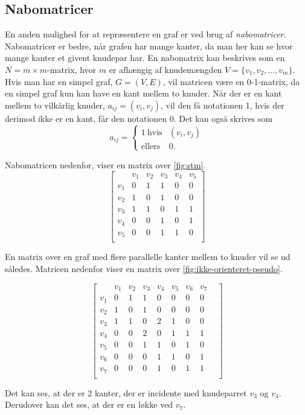 \subsection{Nabomatricer}
En anden mulighed for at repræsentere en graf er ved brug af \emph{nabomatricer}. Nabomatricer er bedre, når grafen har mange kanter, da man her kan se hvor mange kanter et givent knudepar har.
En nabomatrix kan beskrives som en $N=m \times m$-matrix, hvor $m$ er afhængig af knudemængden $V=\{v_1, v_2, \dotsc, v_m\}$. Hvis man har en simpel graf, $G=(V,E)$, vil matricen være en 0-1-matrix, da en simpel graf kun kan have en kant mellem to knuder. Når der er en kant mellem to  vilkårlig knuder, $a_{ij}=(v_i,v_j)$,  vil den få notationen 1, hvis der derimod ikke er en kant, får den notationen 0.
Det kan også skrives som
\[ a_{ij} = \left\{ \begin{array}{ll}
         1 \ \mbox{hvis} & (v_i, v_j)\\
         \mbox{ellers} & 0.\end{array} \right. \]


Nabomatricen nedenfor, viser en matrix over \autoref{fig:stm}.
\begin{equation}
	\begin{bmatrix}
		&v_1&v_2&v_3&v_4&v_5 \\
		v_1&0&1&1&0&0 \\
		v_2&1&0&1&0&0 \\
		v_3&1&1&0&1&1 \\
		v_4&0&0&1&0&1 \\
		v_5&0&0&1&1&0 \\
	\end{bmatrix}
\end{equation}

En matrix over en graf med flere parallelle kanter mellem to knuder vil se ud således. Matricen nedenfor viser en matrix over \autoref{fig:ikke-orienteret-pseudo}.

\begin{equation}
	\begin{bmatrix}
	&v_1&v_2&v_3&v_4&v_5&v_6&v_7& \\
	v_1&0&1&1&0&0&0&0 \\
	v_2&1&0&1&0&0&0&0 \\
	v_3&1&1&0&2&1&0&0 \\
	v_4&0&0&2&0&1&1&1 \\
	v_5&0&0&1&1&0&1&0 \\
	v_6&0&0&0&1&1&0&1 \\
	v_7&0&0&0&1&0&1&1 \\	
	\end{bmatrix}
\end{equation}

Det kan ses, at der er 2 kanter, der er incidente med knudeparret $v_3$ og $v_4$. Derudover kan det ses, at der er en løkke ved $v_7$.

